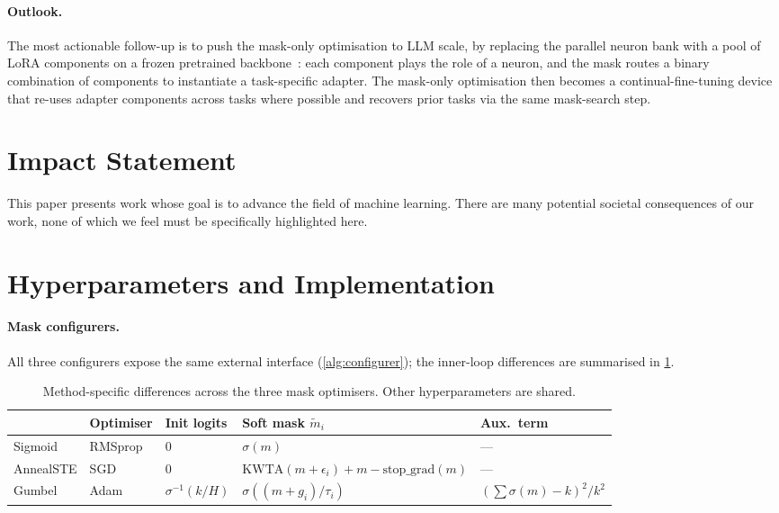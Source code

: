 \documentclass{article}
\theoremstyle{plain}
\theoremstyle{remark}
\begin{document}
\paragraph{Outlook.}
The most actionable follow-up is to push the mask-only optimisation to
LLM scale, by replacing the parallel neuron bank with a pool of LoRA
components on a frozen pretrained backbone~\citep{hu2022lora}: each
component plays the role of a neuron, and the mask routes a binary
combination of components to instantiate a task-specific adapter. The
mask-only optimisation then becomes a continual-fine-tuning device that
re-uses adapter components across tasks where possible and recovers
prior tasks via the same mask-search step.

\section*{Impact Statement}

This paper presents work whose goal is to advance the field of machine
learning. There are many potential societal consequences of our work,
none of which we feel must be specifically highlighted here.




\newpage
\appendix
\onecolumn

\section{Hyperparameters and Implementation}
\label{app:hp}

\paragraph{Mask configurers.}
All three configurers expose the same external interface
(\cref{alg:configurer}); the inner-loop differences are summarised in
\cref{tab:configurer_init}.

\begin{table}[h]
\centering
\caption{Method-specific differences across the three mask
optimisers. Other hyperparameters are shared.}
\label{tab:configurer_init}
\begin{tabular}{lllll}
\toprule
& Optimiser & Init logits & Soft mask $\tilde m_i$ & Aux.\ term \\
\midrule
Sigmoid    & RMSprop & $0$ & $\sigma(m)$ & --- \\
AnnealSTE  & SGD     & $0$ & $\mathrm{KWTA}(m{+}\epsilon_i)+m-\mathrm{stop\_grad}(m)$ & --- \\
Gumbel     & Adam    & $\sigma^{-1}(k/H)$ & $\sigma((m{+}g_i)/\tau_i)$ & $(\sum\sigma(m)-k)^2/k^2$ \\
\bottomrule
\end{tabular}
\end{table}
\end{document}
